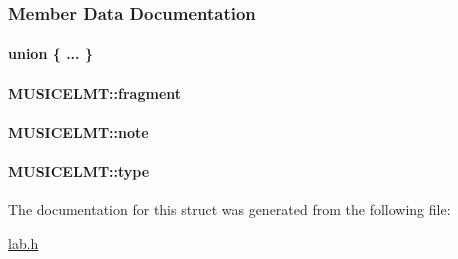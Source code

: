 \subsubsection{Member Data Documentation}
\hypertarget{structMUSICELMT_af2898ea8d200b7d7c051d968d37e4788}{\paragraph[{"@1}]{\setlength{\rightskip}{0pt plus 5cm}union \{ ... \} }}\label{structMUSICELMT_af2898ea8d200b7d7c051d968d37e4788}
\hypertarget{structMUSICELMT_ae418bce8087e7510ad8563a87b4c1c63}{
\paragraph[{fragment}]{ M\+U\+S\+I\+C\+E\+L\+M\+T\+::fragment}}\label{structMUSICELMT_ae418bce8087e7510ad8563a87b4c1c63}
\hypertarget{structMUSICELMT_a662fdb18330107012ed8902725b08e5c}{
\paragraph[{note}]{ M\+U\+S\+I\+C\+E\+L\+M\+T\+::note}}\label{structMUSICELMT_a662fdb18330107012ed8902725b08e5c}
\hypertarget{structMUSICELMT_aa9a541d279b1a98b190c1968217ad37f}{
\paragraph[{type}]{ M\+U\+S\+I\+C\+E\+L\+M\+T\+::type}}\label{structMUSICELMT_aa9a541d279b1a98b190c1968217ad37f}


The documentation for this struct was generated from the following file\+:\begin{DoxyCompactItemize}
\item 
\hyperlink{lab_8h}{lab.\+h}\end{DoxyCompactItemize}
